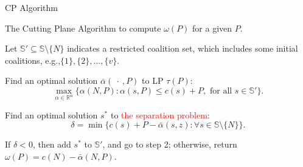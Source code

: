\documentclass[14pt]{beamer}
\begin{document}
\begin{frame}{CP Algorithm}
	\begin{block}
		{The Cutting Plane Algorithm to compute $\omega(P)$ for a given $P$.}
	\end{block}
	\begin{description}
	  \justifying
		\footnotesize
	  \item[Step 1.] Let $\mathbb{S}'\subseteq \mathbb{S}\setminus \{N\}$ indicates a restricted coalition set, which includes some initial coalitions,
	  \vspace{10pt}
	  e.g.,$ \{1\},\{2\},\ldots,\{v\}$.
	  \item[Step 2.] Find an optimal solution $\bar{\alpha}(\ \cdot \ ,P)$ to LP $\tau(P)$:
	  \begin{equation*}
	  \max_{\alpha\in \mathbb{R}^n} \big\{ \alpha(N,P): \alpha(s,P) \leq c(s)+P, \mbox{ for all } s \in \mathbb{S}'\big\}.
	  \end{equation*}
	  \vspace{-11pt}
	  \item[Step 3.]
	  Find an optimal solution $s^*$ to \textcolor{red}{the separation problem}:
	  \begin{equation*}
	  \delta = \min \big\{ c(s)+ P -\bar{\alpha}(s,z): \forall s \in \mathbb{S} \setminus \{N\}\big\}.
	  \end{equation*}
	  \item[Step 4.]
	  If $\delta<0$, then add $s^*$ to $\mathbb{S}'$, and go to step 2; otherwise, return $\omega(P)=c(N)-\bar{\alpha}(N,P)$.
	\end{description}
\end{frame}
\end{document}
